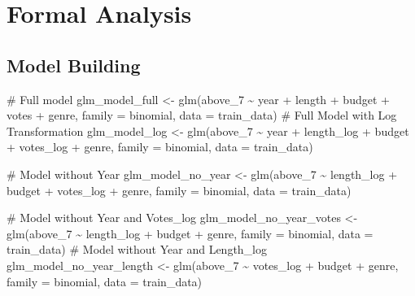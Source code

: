 \documentclass[
  11pt,
]{article}
\newenvironment{Shaded}{\begin{snugshade}}{\end{snugshade}}
\newcommand{\AttributeTok}[1]{\textcolor[rgb]{0.40,0.45,0.13}{#1}}
\newcommand{\CommentTok}[1]{\textcolor[rgb]{0.37,0.37,0.37}{#1}}
\newcommand{\FunctionTok}[1]{\textcolor[rgb]{0.28,0.35,0.67}{#1}}
\newcommand{\NormalTok}[1]{\textcolor[rgb]{0.00,0.23,0.31}{#1}}
\newcommand{\OtherTok}[1]{\textcolor[rgb]{0.00,0.23,0.31}{#1}}
\newcommand{\SpecialCharTok}[1]{\textcolor[rgb]{0.37,0.37,0.37}{#1}}
\begin{document}
\hypertarget{formal-analysis}{%
\section{Formal Analysis}\label{formal-analysis}}

\hypertarget{model-building}{%
\subsection{Model Building}\label{model-building}}

\begin{Shaded}
\begin{Highlighting}[]
\CommentTok{\# Full model}
\NormalTok{glm\_model\_full }\OtherTok{\textless{}{-}} \FunctionTok{glm}\NormalTok{(above\_7 }\SpecialCharTok{\textasciitilde{}}\NormalTok{ year }\SpecialCharTok{+}\NormalTok{ length }\SpecialCharTok{+}\NormalTok{ budget }\SpecialCharTok{+}\NormalTok{ votes }\SpecialCharTok{+}\NormalTok{ genre, }
                      \AttributeTok{family =}\NormalTok{ binomial, }\AttributeTok{data =}\NormalTok{ train\_data)}
\CommentTok{\# Full Model with Log Transformation}
\NormalTok{glm\_model\_log }\OtherTok{\textless{}{-}} \FunctionTok{glm}\NormalTok{(above\_7 }\SpecialCharTok{\textasciitilde{}}\NormalTok{ year }\SpecialCharTok{+}\NormalTok{ length\_log }\SpecialCharTok{+}\NormalTok{ budget }\SpecialCharTok{+}\NormalTok{ votes\_log }\SpecialCharTok{+}\NormalTok{ genre, }
                     \AttributeTok{family =}\NormalTok{ binomial, }\AttributeTok{data =}\NormalTok{ train\_data)}

\CommentTok{\# Model without Year}
\NormalTok{glm\_model\_no\_year }\OtherTok{\textless{}{-}} \FunctionTok{glm}\NormalTok{(above\_7 }\SpecialCharTok{\textasciitilde{}}\NormalTok{ length\_log }\SpecialCharTok{+}\NormalTok{ budget }\SpecialCharTok{+}\NormalTok{ votes\_log }\SpecialCharTok{+}\NormalTok{ genre, }
                        \AttributeTok{family =}\NormalTok{ binomial, }\AttributeTok{data =}\NormalTok{ train\_data)}

\CommentTok{\# Model without Year and Votes\_log}
\NormalTok{glm\_model\_no\_year\_votes }\OtherTok{\textless{}{-}} \FunctionTok{glm}\NormalTok{(above\_7 }\SpecialCharTok{\textasciitilde{}}\NormalTok{ length\_log }\SpecialCharTok{+}\NormalTok{ budget }\SpecialCharTok{+}\NormalTok{ genre, }
                               \AttributeTok{family =}\NormalTok{ binomial, }\AttributeTok{data =}\NormalTok{ train\_data)}
\CommentTok{\# Model without Year and Length\_log}
\NormalTok{glm\_model\_no\_year\_length }\OtherTok{\textless{}{-}} \FunctionTok{glm}\NormalTok{(above\_7 }\SpecialCharTok{\textasciitilde{}}\NormalTok{ votes\_log }\SpecialCharTok{+}\NormalTok{ budget }\SpecialCharTok{+}\NormalTok{ genre, }
                               \AttributeTok{family =}\NormalTok{ binomial, }\AttributeTok{data =}\NormalTok{ train\_data)}
\end{Highlighting}
\end{Shaded}
\end{document}
